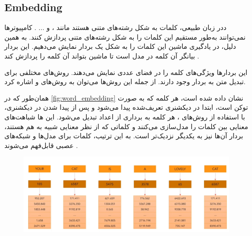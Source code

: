 \subsection{Embedding}
ددر زبان طبیعی، کلمات به شکل رشته‌های متنی هستند مانند ،  و ... . کامپیوترها نمی‌توانند به‌طور مستقیم این کلمات را به شکل رشته‌های متنی پردازش کنند. به همین دلیل، در یادگیری ماشین این کلمات را به شکل یک بردار نمایش می‌دهیم. این بردار بیانگر آن کلمه در مدل است تا ماشین بتواند آن کلمه را پردازش کند \cite{bengio2003neural}.

این بردارها ویژگی‌های کلمه را در فضای عددی نمایش می‌دهند. روش‌های مختلفی برای تبدیل متن به بردار وجود دارند. از جمله این روش‌ها می‌توان به روش‌های  \cite{mikolov2013distributed} و  \cite{pennington2014glove} اشاره کرد.

همان‌طور که در \autoref{fig:word_embedding} نشان داده شده است، هر کلمه که به صورت توکن است، ابتدا در دیکشنری تعریف‌شده پیدا می‌شود و پس از پیدا شدن در دیکشنری، با استفاده از روش‌های ، هر کلمه به برداری از اعداد تبدیل می‌شود. این ‌ها شباهت‌های معنایی بین کلمات را مدل‌سازی می‌کنند و کلماتی که از نظر معنایی شبیه به هم هستند، بردار آن‌ها نیز به یکدیگر نزدیک‌تر است. به این ترتیب، کلمات برای مدل‌ها و شبکه‌های عصبی قابل‌فهم می‌شوند \cite{mikolov2013distributed,pennington2014glove}.





 \begin{figure}[h]
 	\centering
 	\begin{minipage}[b]{0.7\textwidth}
 		\centering
 		\includegraphics[width=\textwidth]{transformer_images/word_embedding.png}
 		\caption{}
 		\label{fig:word_embedding}
 	\end{minipage}
 	\hfill
 \end{figure}



\subsection{}

